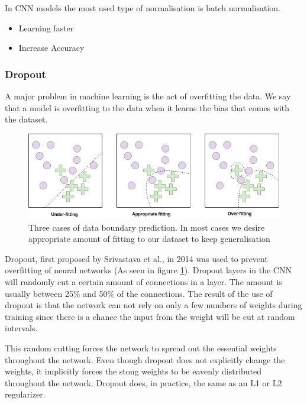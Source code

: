 In CNN models the most used type of normalisation is batch normalisation.

\begin{itemize}
\item Learning faster
\item Increase Accuracy
\end{itemize}




\subsubsection{Dropout}
A major problem in machine learning is the act of overfitting the data. We say that a model is overfitting to the data when it learns the bias that comes with the dataset. 
 
\begin{figure}[h]
        \centering
        \includegraphics[scale=0.6]{background/figures/Under_vs_overfitting.png}
        \caption{Three cases of data boundary prediction. In most cases we desire appropriate amount of fitting to our dataset to keep generalisation}
        \label{fig:dropout}
\end{figure}


Dropout, first proposed by Srivastava et al.\cite{JMLR:v15:srivastava14a}, in 2014 was used to prevent overfitting of neural networks (As seen in figure \ref{fig:dropout}).
Dropout layers in the CNN will randomly cut a certain amount of connections in a layer. The amount is usually between 25\% and 50\% of the connections. The result of the use of dropout is that the network can not rely on only a few numbers of weights during training since there is a chance the input from the weight will be cut at random intervals. 

This random cutting forces the network to spread out the essential weights throughout the network. 
Even though dropout does not explicitly change the weights, it implicitly forces the stong weights to be eavenly distributed throughout the network. 
Dropout does, in practice, the same as an L1 or L2 regularizer. 



